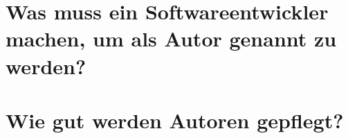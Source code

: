 \section{Was muss ein Softwareentwickler machen, um als Autor genannt zu werden?}
\label{sec:zitationsfaehiger_autor_diskussion}

\section{Wie gut werden Autoren gepflegt?}
\label{sec:autoren_pflege_diskussion}
